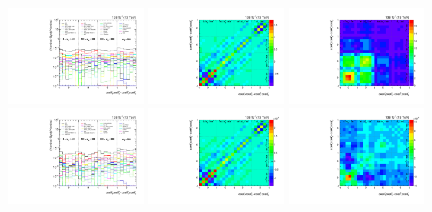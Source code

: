\begin{refsection}
\begin{figure}[htb]
\begin{center}
 \includegraphics[width=0.32\textwidth]{fig_fullRun2UL/unfolding/combined/deltaSystCombinedlog_rebinnedB_c_Mrk_mttbar.pdf}
 \includegraphics[width=0.32\textwidth]{fig_fullRun2UL/unfolding/combined/StatCovMatrix_rebinnedB_c_Mrk_mttbar.pdf}
 \includegraphics[width=0.32\textwidth]{fig_fullRun2UL/unfolding/combined/TotalSystCovMatrix_rebinnedB_c_Mrk_mttbar.pdf} \\
 \includegraphics[width=0.32\textwidth]{fig_fullRun2UL/unfolding/combined/deltaSystCombinedlogNorm_rebinnedB_c_Mrk_mttbar.pdf}
 \includegraphics[width=0.32\textwidth]{fig_fullRun2UL/unfolding/combined/StatCovMatrixNorm_rebinnedB_c_Mrk_mttbar.pdf}
 \includegraphics[width=0.32\textwidth]{fig_fullRun2UL/unfolding/combined/TotalSystCovMatrixNorm_rebinnedB_c_Mrk_mttbar.pdf} \\

\end{center}
\end{figure}
\end{refsection}
